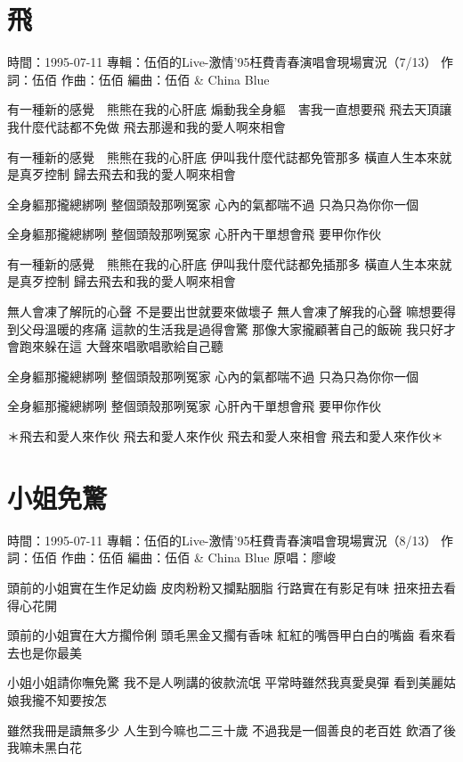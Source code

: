 \documentclass[UTF8,a4paper,oneside,twocolumn,12pt]{ctexbook}
\newcommand{\infopair}[2]{\textbullet #1：#2}
\newcommand{\zc}[1][伍佰]{\infopair{作詞}{#1}}
\newcommand{\zq}[1][伍佰]{\infopair{作曲}{#1}}
\newcommand{\bq}[1][伍佰]{\infopair{編曲}{#1}}
\newcommand{\zj}[1]{\infopair{專輯}{#1}}
\newcommand{\yc}[1]{\infopair{原唱}{#1}}
\newcommand{\sj}[1]{\infopair{時間}{#1}}
\newenvironment{info}{\begin{flushleft}\kaishu
	}
	{\end{flushleft}\normalsize\yahei\par}
\newenvironment{lyric}{
	}
{}
\begin{document}
\section{飛}
\begin{info}
	\sj{1995-07-11}
	\zj{伍佰的Live-激情'95枉費青春演唱會現場實況（7/13）}
	\zc
	\zq
	\bq[伍佰 \& China Blue]
\end{info}
\begin{lyric}
	有一種新的感覺　熊熊在我的心肝底
	煽動我全身軀　害我一直想要飛
	飛去天頂讓我什麼代誌都不免做
	飛去那邊和我的愛人啊來相會

	有一種新的感覺　熊熊在我的心肝底
	伊叫我什麼代誌都免管那多
	橫直人生本來就是真歹控制
	歸去飛去和我的愛人啊來相會

	全身軀那攏總綁咧
	整個頭殼那咧冤家
	心內的氣都喘不過
	只為只為你你一個

	全身軀那攏總綁咧
	整個頭殼那咧冤家
	心肝內干單想會飛
	要甲你作伙

	有一種新的感覺　熊熊在我的心肝底
	伊叫我什麼代誌都免插那多
	橫直人生本來就是真歹控制
	歸去飛去和我的愛人啊來相會

	無人會凍了解阮的心聲
	不是要出世就要來做壞子
	無人會凍了解我的心聲
	嘛想要得到父母溫暖的疼痛
	這款的生活我是過得會驚
	那像大家攏顧著自己的飯碗
	我只好才會跑來躲在這
	大聲來唱歌唱歌給自己聽

	全身軀那攏總綁咧
	整個頭殼那咧冤家
	心內的氣都喘不過
	只為只為你你一個

	全身軀那攏總綁咧
	整個頭殼那咧冤家
	心肝內干單想會飛
	要甲你作伙

	＊飛去和愛人來作伙
	飛去和愛人來作伙
	飛去和愛人來相會
	飛去和愛人來作伙＊
\end{lyric}

\section{小姐免驚}
\begin{info}
	\sj{1995-07-11}
	\zj{伍佰的Live-激情'95枉費青春演唱會現場實況（8/13）}
	\zc
	\zq
	\bq[伍佰 \& China Blue]
	\yc{廖峻}
\end{info}
\begin{lyric}
	頭前的小姐實在生作足幼齒
	皮肉粉粉又攔點胭脂
	行路實在有影足有味
	扭來扭去看得心花開

	頭前的小姐實在大方擱伶俐
	頭毛黑金又擱有香味
	紅紅的嘴唇甲白白的嘴齒
	看來看去也是你最美

	小姐小姐請你嘸免驚
	我不是人咧講的彼款流氓
	平常時雖然我真愛臭彈
	看到美麗姑娘我攏不知要按怎

	雖然我冊是讀無多少
	人生到今嘛也二三十歲
	不過我是一個善良的老百姓
	飲酒了後我嘛未黑白花
\end{lyric}
\end{document}
